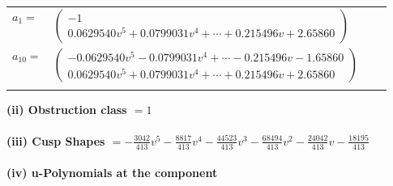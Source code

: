\documentclass[1p]{elsarticle_modified}
\theoremstyle{definition}
\begin{document}
\begin{tabular}{m{7pt} m{180pt} m{7pt} m{180pt} }
\flushright $a_{1}=$&$\begin{pmatrix}-1\\0.0629540 v^{5}+0.0799031 v^{4}+\cdots+0.215496 v+2.65860\end{pmatrix}$ \\
\flushright $a_{10}=$&$\begin{pmatrix}-0.0629540 v^{5}-0.0799031 v^{4}+\cdots-0.215496 v-1.65860\\0.0629540 v^{5}+0.0799031 v^{4}+\cdots+0.215496 v+2.65860\end{pmatrix}$\\&\end{tabular}
\flushleft \textbf{(ii) Obstruction class $= 1$}\\~\\
\flushleft \textbf{(iii) Cusp Shapes $= -\frac{3042}{413} v^5-\frac{8817}{413} v^4-\frac{44523}{413} v^3-\frac{68494}{413} v^2-\frac{24042}{413} v-\frac{18195}{413}$}\\~\\
\newpage\renewcommand{\arraystretch}{1}
\flushleft \textbf{(iv) u-Polynomials at the component}\newline \\
\end{document}
